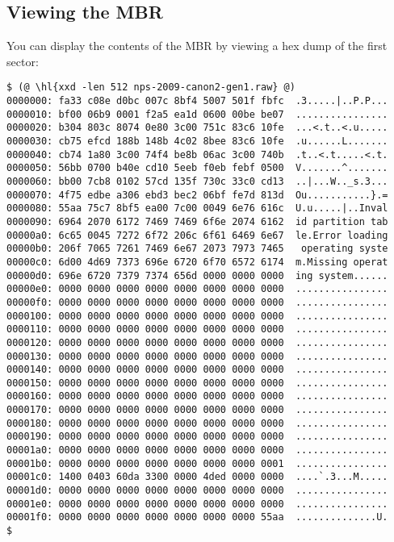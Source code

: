 \subsection{Viewing the MBR}

You can display the contents of the MBR by viewing a hex dump of the
first sector:

\begin{Verbatim}
$ (@ \hl{xxd -len 512 nps-2009-canon2-gen1.raw} @)
0000000: fa33 c08e d0bc 007c 8bf4 5007 501f fbfc  .3.....|..P.P...
0000010: bf00 06b9 0001 f2a5 ea1d 0600 00be be07  ................
0000020: b304 803c 8074 0e80 3c00 751c 83c6 10fe  ...<.t..<.u.....
0000030: cb75 efcd 188b 148b 4c02 8bee 83c6 10fe  .u......L.......
0000040: cb74 1a80 3c00 74f4 be8b 06ac 3c00 740b  .t..<.t.....<.t.
0000050: 56bb 0700 b40e cd10 5eeb f0eb febf 0500  V.......^.......
0000060: bb00 7cb8 0102 57cd 135f 730c 33c0 cd13  ..|...W.._s.3...
0000070: 4f75 edbe a306 ebd3 bec2 06bf fe7d 813d  Ou...........}.=
0000080: 55aa 75c7 8bf5 ea00 7c00 0049 6e76 616c  U.u.....|..Inval
0000090: 6964 2070 6172 7469 7469 6f6e 2074 6162  id partition tab
00000a0: 6c65 0045 7272 6f72 206c 6f61 6469 6e67  le.Error loading
00000b0: 206f 7065 7261 7469 6e67 2073 7973 7465   operating syste
00000c0: 6d00 4d69 7373 696e 6720 6f70 6572 6174  m.Missing operat
00000d0: 696e 6720 7379 7374 656d 0000 0000 0000  ing system......
00000e0: 0000 0000 0000 0000 0000 0000 0000 0000  ................
00000f0: 0000 0000 0000 0000 0000 0000 0000 0000  ................
0000100: 0000 0000 0000 0000 0000 0000 0000 0000  ................
0000110: 0000 0000 0000 0000 0000 0000 0000 0000  ................
0000120: 0000 0000 0000 0000 0000 0000 0000 0000  ................
0000130: 0000 0000 0000 0000 0000 0000 0000 0000  ................
0000140: 0000 0000 0000 0000 0000 0000 0000 0000  ................
0000150: 0000 0000 0000 0000 0000 0000 0000 0000  ................
0000160: 0000 0000 0000 0000 0000 0000 0000 0000  ................
0000170: 0000 0000 0000 0000 0000 0000 0000 0000  ................
0000180: 0000 0000 0000 0000 0000 0000 0000 0000  ................
0000190: 0000 0000 0000 0000 0000 0000 0000 0000  ................
00001a0: 0000 0000 0000 0000 0000 0000 0000 0000  ................
00001b0: 0000 0000 0000 0000 0000 0000 0000 0001  ................
00001c0: 1400 0403 60da 3300 0000 4ded 0000 0000  ....`.3...M.....
00001d0: 0000 0000 0000 0000 0000 0000 0000 0000  ................
00001e0: 0000 0000 0000 0000 0000 0000 0000 0000  ................
00001f0: 0000 0000 0000 0000 0000 0000 0000 55aa  ..............U.
$ 
\end{Verbatim}

